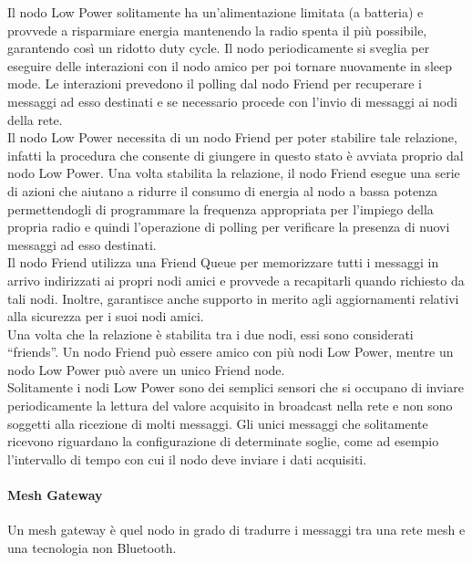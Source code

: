 \noindent Il nodo Low Power solitamente ha un'alimentazione limitata (a batteria) e provvede a risparmiare energia mantenendo la radio spenta il più possibile, garantendo così un ridotto duty cycle. Il nodo periodicamente si sveglia per eseguire delle interazioni con il nodo amico per poi tornare nuovamente in sleep mode. Le interazioni prevedono il polling dal nodo Friend per recuperare i messaggi ad esso destinati e se necessario procede con l'invio di messaggi ai nodi della rete.\\
Il nodo Low Power necessita di un nodo Friend per poter stabilire tale relazione, infatti la procedura che consente di giungere in questo stato è avviata proprio dal nodo Low Power. Una volta stabilita la relazione, il nodo Friend esegue una serie di azioni che aiutano a ridurre il consumo di energia al nodo a bassa potenza permettendogli di programmare la frequenza appropriata per l'impiego della propria radio e quindi l'operazione di polling per verificare la presenza di nuovi messaggi ad esso destinati.\\
Il nodo Friend utilizza una Friend Queue per memorizzare tutti i messaggi in arrivo indirizzati ai propri nodi amici e provvede a recapitarli quando richiesto da tali nodi. Inoltre, garantisce anche supporto in merito agli aggiornamenti relativi alla sicurezza per i suoi nodi amici.\\
Una volta che la relazione è stabilita tra i due nodi, essi sono considerati ``friends''. Un nodo Friend può essere amico con più nodi Low Power, mentre un nodo Low Power può avere un unico Friend node.\\

\noindent Solitamente i nodi Low Power sono dei semplici sensori che si occupano di inviare periodicamente la lettura del valore acquisito in broadcast nella rete e non sono soggetti alla ricezione di molti messaggi. Gli unici messaggi che solitamente ricevono riguardano la configurazione di determinate soglie, come ad esempio l'intervallo di tempo con cui il nodo deve inviare i dati acquisiti.

\paragraph{Mesh Gateway}
Un mesh gateway è quel nodo in grado di tradurre i messaggi tra una rete mesh e una tecnologia non Bluetooth.

